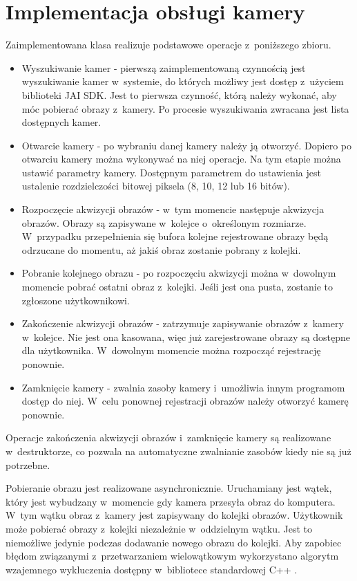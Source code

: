 \section{Implementacja obsługi kamery}
\label{sec:implementacjaKamery}

Zaimplementowana klasa realizuje podstawowe operacje z~poniższego zbioru. 
\begin{itemize}
\item Wyszukiwanie kamer - pierwszą zaimplementowaną czynnością jest wyszukiwanie kamer w~systemie, do których możliwy jest dostęp z~użyciem biblioteki JAI SDK. Jest to pierwsza czynność, którą należy wykonać, aby móc pobierać obrazy z~kamery. Po procesie wyszukiwania zwracana jest lista dostępnych kamer.
\item Otwarcie kamery - po wybraniu danej kamery należy ją otworzyć. Dopiero po otwarciu kamery można wykonywać na niej operacje. Na tym etapie można ustawić parametry kamery. Dostępnym parametrem do ustawienia jest ustalenie rozdzielczości bitowej piksela (8, 10, 12 lub 16 bitów).
\item Rozpoczęcie akwizycji obrazów - w~tym momencie następuje akwizycja obrazów. Obrazy są zapisywane w~kolejce o~określonym rozmiarze. W~przypadku przepełnienia się bufora kolejne rejestrowane obrazy będą odrzucane do momentu, aż jakiś obraz zostanie pobrany z kolejki.
\item Pobranie kolejnego obrazu - po rozpoczęciu akwizycji można w~dowolnym momencie pobrać ostatni obraz z~kolejki. Jeśli jest ona pusta, zostanie to zgłoszone użytkownikowi.
\item Zakończenie akwizycji obrazów - zatrzymuje zapisywanie obrazów z~kamery w~kolejce. Nie jest ona kasowana, więc już zarejestrowane obrazy są dostępne dla użytkownika. W~dowolnym momencie można rozpocząć rejestrację ponownie.
\item Zamknięcie kamery - zwalnia zasoby kamery i~umożliwia innym programom dostęp do niej. W~celu ponownej rejestracji obrazów należy otworzyć kamerę ponownie.
\end{itemize}
Operacje zakończenia akwizycji obrazów i~zamknięcie kamery są realizowane w~destruktorze, co pozwala na automatyczne zwalnianie zasobów kiedy nie są już potrzebne.

Pobieranie obrazu jest realizowane asynchronicznie. Uruchamiany jest wątek, który jest wybudzany w~momencie gdy kamera przesyła obraz do komputera. W~tym wątku obraz z~kamery jest zapisywany do kolejki obrazów. Użytkownik może pobierać obrazy z~kolejki niezależnie w~oddzielnym wątku. Jest to niemożliwe jedynie podczas dodawanie nowego obrazu do kolejki. Aby zapobiec błędom związanymi z~przetwarzaniem wielowątkowym wykorzystano algorytm wzajemnego wykluczenia dostępny w~bibliotece standardowej C++ \cite{mutexCpp}.